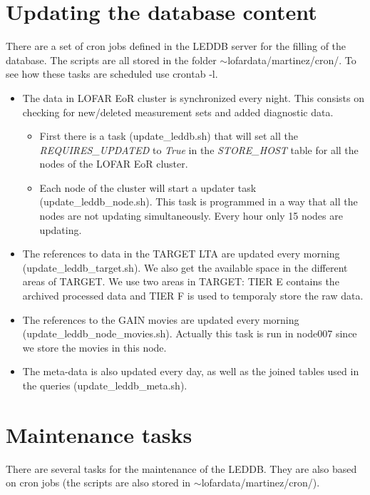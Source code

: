 \documentclass[a4paper,11pt]{article}
\begin{document}
\section{Updating the database content}

There are a set of cron jobs defined in the LEDDB server for the filling of the database. The scripts are all stored in the folder $\sim$lofardata/martinez/cron/. To see how these tasks are scheduled use crontab -l. 

\begin{itemize}
	\item The data in LOFAR EoR cluster is synchronized every night. This consists on checking for new/deleted measurement sets and added diagnostic data. 
	
	\begin{itemize}
		\item First there is a task (update\_leddb.sh) that will set all the \textit{REQUIRES\_UPDATED} to \textit{True} in the \textit{STORE\_HOST} table for all the nodes of the LOFAR EoR cluster.
	
		\item Each node of the cluster will start a updater task (update\_leddb\_node.sh). This task is programmed in a way that all the nodes are not updating simultaneously. Every hour only 15 nodes are updating.
	\end{itemize}
	
	\item The references to data in the TARGET LTA are updated every morning (update\_leddb\_target.sh). We also get the available space in the different areas of TARGET. We use two areas in TARGET: TIER E contains the archived processed data and TIER F is used to temporaly store the raw data.
	
	\item The references to the GAIN movies are updated every morning (update\_leddb\_node\_movies.sh). Actually this task is run in node007 since we store the movies in this node.
	  
	\item The meta-data is also updated every day, as well as the joined tables used in the queries (update\_leddb\_meta.sh). 
\end{itemize}

\section{Maintenance tasks}

There are several tasks for the maintenance of the LEDDB. They are also based on cron jobs (the scripts are also stored in $\sim$lofardata/martinez/cron/).
\end{document}
